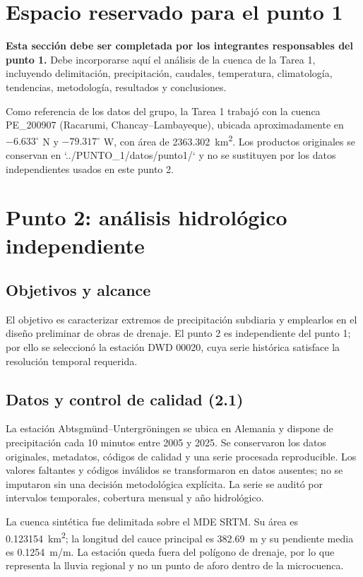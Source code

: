 \documentclass[man]{apa7}
\begin{document}
\section{Espacio reservado para el punto 1}
\textbf{Esta sección debe ser completada por los integrantes responsables del punto 1.} Debe incorporarse aquí el análisis de la cuenca de la Tarea 1, incluyendo delimitación, precipitación, caudales, temperatura, climatología, tendencias, metodología, resultados y conclusiones.\par

Como referencia de los datos del grupo, la Tarea 1 trabajó con la cuenca PE\_200907 (Racarumi, Chancay--Lambayeque), ubicada aproximadamente en $-6.633^\circ$ N y $-79.317^\circ$ W, con área de \SI{2363.302}{km^2}. Los productos originales se conservan en `../PUNTO_1/datos/punto1/` y no se sustituyen por los datos independientes usados en este punto 2.

\section{Punto 2: análisis hidrológico independiente}
\subsection{Objetivos y alcance}
El objetivo es caracterizar extremos de precipitación subdiaria y emplearlos en el diseño preliminar de obras de drenaje. El punto 2 es independiente del punto 1; por ello se seleccionó la estación DWD 00020, cuya serie histórica satisface la resolución temporal requerida.

\subsection{Datos y control de calidad (2.1)}
La estación Abtsgmünd--Untergröningen se ubica en Alemania y dispone de precipitación cada 10 minutos entre 2005 y 2025. Se conservaron los datos originales, metadatos, códigos de calidad y una serie procesada reproducible. Los valores faltantes y códigos inválidos se transformaron en datos ausentes; no se imputaron sin una decisión metodológica explícita. La serie se auditó por intervalos temporales, cobertura mensual y año hidrológico.

La cuenca sintética fue delimitada sobre el MDE SRTM. Su área es \SI{0.123154}{km^2}; la longitud del cauce principal es \SI{382.69}{m} y su pendiente media es \SI{0.1254}{m/m}. La estación queda fuera del polígono de drenaje, por lo que representa la lluvia regional y no un punto de aforo dentro de la microcuenca.
\end{document}
